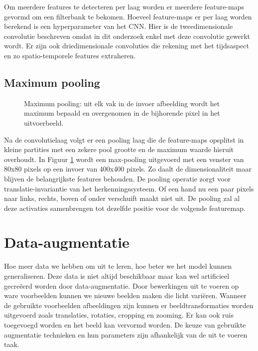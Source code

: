 \npar Om meerdere features te detecteren per laag worden er meerdere feature-maps gevormd om een filterbank te bekomen. Hoeveel feature-maps er per laag worden berekend is een hyperparameter van het CNN. Hier is de tweedimensionale convolutie beschreven omdat in dit onderzoek enkel met deze convolutie gewerkt wordt. Er zijn ook driedimensionale convoluties die rekening met het tijdsaspect en zo spatio-temporele features extraheren.
\subsection{Maximum pooling}

\begin{figure}[t!]
	\centering
	
	\caption{Maximum pooling: uit elk vak in de invoer afbeelding wordt het maximum bepaald en overgenomen in de bijhorende pixel in het uitvoerbeeld.}
	\label{fig:max-pooling}
\end{figure}
Na de convolutielaag volgt er een pooling laag die de feature-maps opsplitst in kleine partities met een zekere pool grootte en de maximum waarde hieruit overhoudt. In Figuur \ref{fig:max-pooling} wordt een max-pooling uitgevoerd met een venster van 80x80 pixels op een invoer van 400x400 pixels. Zo daalt de dimensionaliteit maar blijven de belangrijkste features behouden.
\npar De pooling operatie zorgt voor translatie-invariantie van het herkenningssysteem. Of een hand nu een paar pixels naar links, rechts, boven of onder verschuift maakt niet uit. De pooling zal al deze activaties samenbrengen tot dezelfde positie voor de volgende featuremap. 

\section{Data-augmentatie}\label{sec:data-augm}
Hoe meer data we hebben om uit te leren, hoe beter we het model kunnen generaliseren. Deze data is niet altijd beschikbaar maar kan wel artificieel gecre\"eerd worden door data-augmentatie. Door bewerkingen uit te voeren op ware voorbeelden kunnen we nieuwe beelden maken die licht vari\"eren.
\npar Wanneer de gebruikte voorbeelden afbeeldingen zijn kunnen er beeldtransformaties worden uitgevoerd zoals translaties, rotaties, cropping en zooming. Er kan ook ruis toegevoegd worden en het beeld kan vervormd worden. De keuze van gebruikte augmentatie technieken en hun parameters zijn afhankelijk van de uit te voeren taak. 

